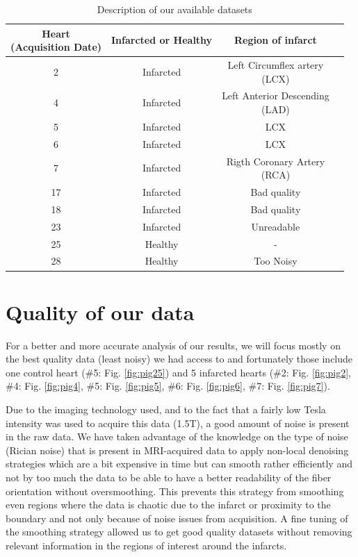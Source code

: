 \begin{table}
    \centering
    \begin{tabular}{|c | c | c | c|} 
         \hline
         \shortstack{Heart \\ (Acquisition Date)} & Infarcted or Healthy & Region of infarct \\
         \hline
         2 & Infarcted & \shortstack{Left Circumflex artery \\ (LCX)} \\ 
         \hline
         4 & Infarcted & \shortstack{Left Anterior Descending \\ (LAD)} \\
         \hline
         5 & Infarcted & LCX \\
         \hline
         6 & Infarcted & LCX \\
         \hline
         7 & Infarcted & \shortstack{Rigth Coronary Artery \\ (RCA)} \\ 
         \hline
         17 & Infarcted & Bad quality \\
         \hline
         18 & Infarcted & Bad quality \\
         \hline
         23 & Infarcted & Unreadable \\
         \hline
         25 & Healthy & - \\
         \hline
         28 & Healthy & Too Noisy \\
         \hline
    \end{tabular}
    \caption{Description of our available datasets}
\end{table}

\section{Quality of our data}

For a better and more accurate analysis of our results, we will focus mostly on the best quality data (least noisy) we had access to and fortunately those include one control heart (\#5: Fig. \ref{fig:pig25}) and 5 infarcted hearts (\#2: Fig. \ref{fig:pig2}, \#4: Fig. \ref{fig:pig4}, \#5: Fig. \ref{fig:pig5}, \#6: Fig. \ref{fig:pig6}, \#7: Fig. \ref{fig:pig7}).

Due to the imaging technology used, and to the fact that a fairly low Tesla intensity was used to acquire this data (1.5T), a good amount of noise is present in the raw data. We have taken advantage of the knowledge on the type of noise (Rician noise) that is present in MRI-acquired data to apply non-local denoising strategies which are a bit expensive in time but can smooth rather efficiently and not by too much the data to be able to have a better readability of the fiber orientation without oversmoothing. This prevents this strategy from smoothing even regions where the data is chaotic due to the infarct or proximity to the boundary and not only because of noise issues from acquisition. A fine tuning of the smoothing strategy allowed us to get good quality datasets without removing relevant information in the regions of interest around the infarcts.

